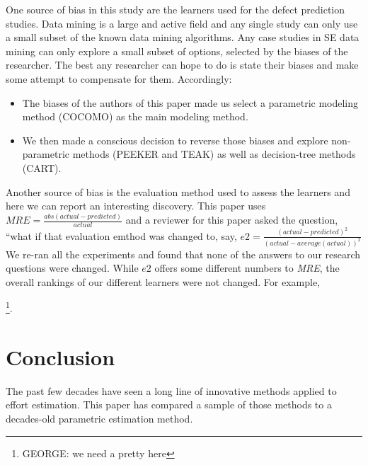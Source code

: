 \documentclass[smallcondesed]{svjour3}
\newcommand{\bi}{\begin{itemize}[leftmargin=0.4cm]}
\newcommand{\ei}{\end{itemize}}
\newenvironment{BLUE}{\color{blue}}{\ignorespacesafterend}
\begin{document}
One source of bias in this study
are the learners used for the defect prediction
studies. Data mining is a large and active field and
any single study can only use a small subset of the
known data mining algorithms.
Any case studies
in SE data mining  can only explore a small
subset of options, selected by the biases of the researcher. The best any researcher
can hope to do is state their biases and make some attempt to compensate for them.
Accordingly:
\bi
\item
The
biases of the authors of this paper made us select
a parametric modeling method (COCOMO)  as the main modeling method.
\item
We then made a conscious decision to reverse those biases
and explore non-parametric methods (PEEKER and TEAK) as well
as decision-tree methods (CART).
\ei
\begin{BLUE}
Another source of bias is the evaluation method used to assess the learners
and here we can report an interesting discovery. This paper uses
\mbox{$ \mathit{MRE}=\frac{abs(\mathit{actual} - \mathit{predicted})}{\mathit{actual}}$}
and a reviewer for this paper asked the question, ``what if that evaluation emthod
was changed to, say,
\mbox{$ \mathit{e2}=\frac{ (\mathit{actual} - \mathit{predicted})^2}{(\mathit{actual - average(actual)})^2}$}
We re-ran all the experiments and found that none of the answers to our research questions were changed.
While $e2$ offers some different numbers to {\em MRE}, the overall rankings of our different
learners were not changed. For example,

\footnote{GEORGE: we need a pretty here}.
\end{BLUE}

\section{Conclusion}
The past few decades have seen a long line of innovative  methods
applied to effort estimation. This paper has compared a sample of those methods
to a decades-old parametric estimation method. 
\end{document}
